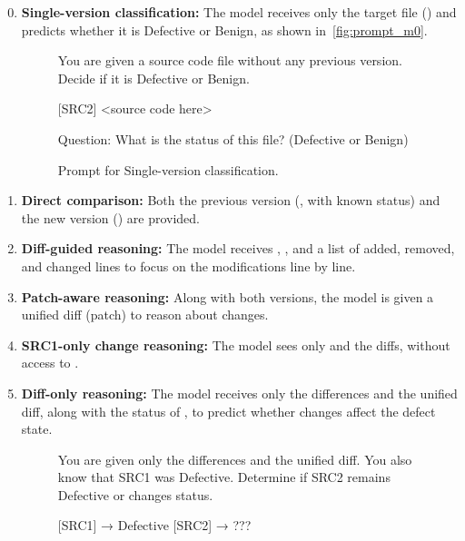 \documentclass[authoryear,final,5p,times,twocolumn]{elsarticle}
\theoremstyle{plain}
\begin{document}
\begin{enumerate}
\setcounter{enumi}{-1}

\item \textbf{Single-version classification:} 
The model receives only the target file () and predicts whether it is Defective or Benign, as shown in~\autoref{fig:prompt_m0}.

\begin{figure}[ht]
\centering
\begin{promptbox}
You are given a source code file without any previous version. Decide if it is Defective or Benign.

[SRC2]
\textless source code here\textgreater

Question: What is the status of this file? (Defective or Benign)
\end{promptbox}
\caption{Prompt for Single-version classification.}
\label{fig:prompt_m0}
\end{figure}

\item \textbf{Direct comparison:} 
Both the previous version (, with known status) and the new version () are provided.

\item \textbf{Diff-guided reasoning:} 
The model receives , , and a list of added, removed, and changed lines to focus on the modifications line by line.

\item \textbf{Patch-aware reasoning:} 
Along with both versions, the model is given a unified diff (patch) to reason about changes.

\item \textbf{SRC1-only change reasoning:} 
The model sees only  and the diffs, without access to .

\item \textbf{Diff-only reasoning:} 
The model receives only the differences and the unified diff, along with the status of , to predict whether changes affect the defect state.

\begin{figure}[ht]
\centering
\begin{promptbox}
You are given only the differences and the unified diff. You also know that SRC1 was Defective. Determine if SRC2 remains Defective or changes status.

[SRC1] → Defective
[SRC2] → ???


\end{promptbox}
\end{figure}
\end{enumerate}
\end{document}
